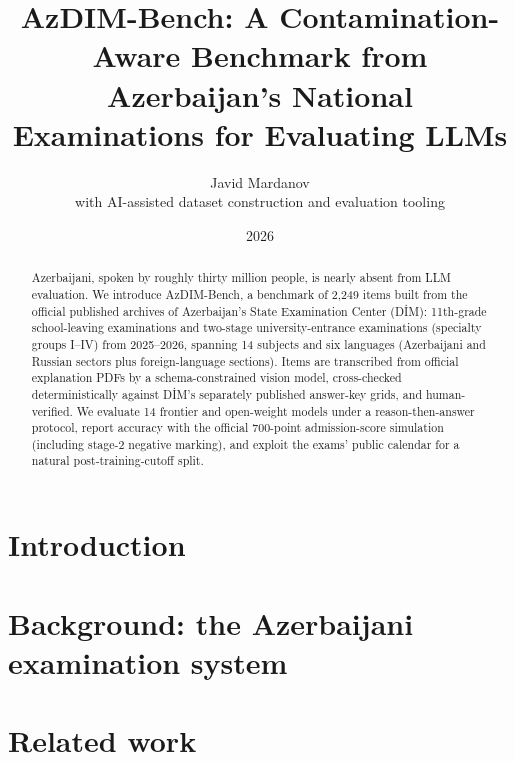 \documentclass[11pt]{article}
\title{AzDIM-Bench: A Contamination-Aware Benchmark from\\
Azerbaijan's National Examinations for Evaluating LLMs}
\author{Javid Mardanov\\
\small with AI-assisted dataset construction and evaluation tooling}
\date{2026}
\begin{document}
\maketitle

\begin{abstract}
Azerbaijani, spoken by roughly thirty million people, is nearly absent from
LLM evaluation. We introduce AzDIM-Bench, a benchmark of 2{,}249 items
built from the official published archives of Azerbaijan's State Examination
Center (D\.IM): 11th-grade school-leaving examinations and two-stage
university-entrance examinations (specialty groups I--IV) from 2025--2026,
spanning 14 subjects and six languages (Azerbaijani and Russian sectors plus
foreign-language sections). Items are transcribed from official explanation
PDFs by a schema-constrained vision model, cross-checked deterministically
against D\.IM's separately published answer-key grids, and human-verified.
We evaluate 14 frontier and open-weight models under a reason-then-answer
protocol, report accuracy with the official 700-point admission-score
simulation (including stage-2 negative marking), and exploit the exams'
public calendar for a natural post-training-cutoff split.
\end{abstract}

\section{Introduction}

\section{Background: the Azerbaijani examination system}

\section{Related work}
\end{document}
